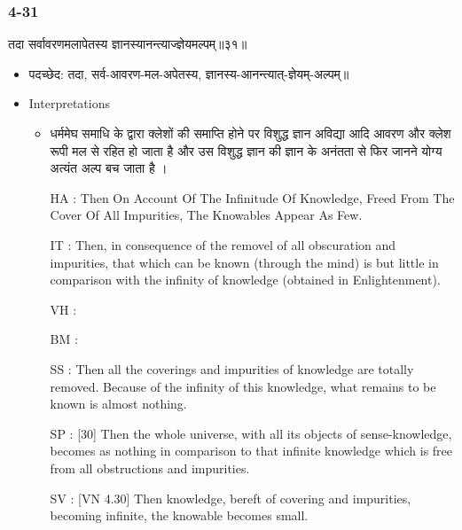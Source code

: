 \begin{frame}[fragile]\frametitle{4-31}
\begin{sanskrit}
तदा सर्वावरणमलापेतस्य ज्ञानस्यानन्त्याज्ज्ञेयमल्पम्॥३१॥
\end{sanskrit}

	\begin{itemize}
	\item पदच्छेद:  तदा, सर्व-आवरण-मल-अपेतस्य, ज्ञानस्य-आनन्त्यात्-ज्ञेयम्-अल्पम्॥
	\item Interpretations
		\begin{itemize}	
		\item धर्ममेघ समाधि के द्वारा क्लेशों की समाप्ति होने पर विशुद्ध ज्ञान अविद्या आदि आवरण और क्लेश रूपी मल से रहित हो जाता है और उस विशुद्ध ज्ञान की ज्ञान के अनंतता से फिर जानने योग्य अत्यंत अल्प बच जाता है ।
		\item [HA]: Then On Account Of The Infinitude Of Knowledge, Freed From The Cover Of All Impurities, The Knowables Appear As Few.
		\item [IT]: Then, in consequence of the removel of all obscuration and impurities, that which can be known (through the mind) is but little in comparison with the infinity of knowledge (obtained in Enlightenment).
		\item [VH]: 
		\item [BM]: 
		\item [SS]: Then all the coverings and impurities of knowledge are totally removed. Because of the infinity of this knowledge, what remains to be known is almost nothing.
		\item [SP]: [30] Then the whole universe, with all its objects of sense-knowledge, becomes as nothing in comparison to that infinite knowledge which is free from all obstructions and impurities.
		\item [SV]: [VN 4.30] Then knowledge, bereft of covering and impurities, becoming infinite, the knowable becomes small. 
		\end{itemize}
	\end{itemize}
\end{frame}


